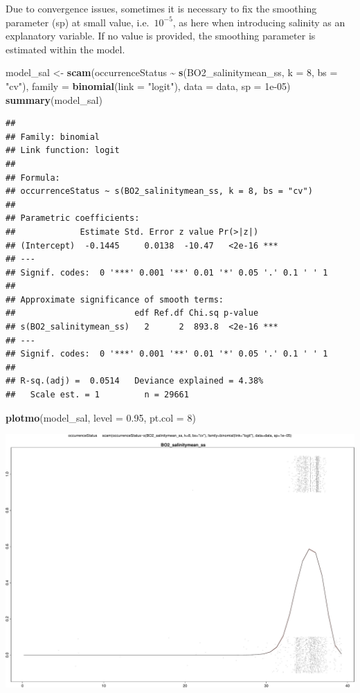 \documentclass[
]{book}
\newenvironment{Shaded}{\begin{snugshade}}{\end{snugshade}}
\newcommand{\AttributeTok}[1]{\textcolor[rgb]{0.13,0.29,0.53}{#1}}
\newcommand{\DecValTok}[1]{\textcolor[rgb]{0.00,0.00,0.81}{#1}}
\newcommand{\FloatTok}[1]{\textcolor[rgb]{0.00,0.00,0.81}{#1}}
\newcommand{\FunctionTok}[1]{\textcolor[rgb]{0.13,0.29,0.53}{\textbf{#1}}}
\newcommand{\NormalTok}[1]{#1}
\newcommand{\OtherTok}[1]{\textcolor[rgb]{0.56,0.35,0.01}{#1}}
\newcommand{\SpecialCharTok}[1]{\textcolor[rgb]{0.81,0.36,0.00}{\textbf{#1}}}
\newcommand{\StringTok}[1]{\textcolor[rgb]{0.31,0.60,0.02}{#1}}
\begin{document}
Due to convergence issues, sometimes it is necessary to fix the smoothing parameter (sp) at small value, i.e.~\(10^{-5}\), as here when introducing salinity as an explanatory variable. If no value is provided, the smoothing parameter is estimated within the model.

\begin{Shaded}
\begin{Highlighting}[]
\NormalTok{model\_sal }\OtherTok{\textless{}{-}} \FunctionTok{scam}\NormalTok{(occurrenceStatus }\SpecialCharTok{\textasciitilde{}} \FunctionTok{s}\NormalTok{(BO2\_salinitymean\_ss,}
    \AttributeTok{k =} \DecValTok{8}\NormalTok{, }\AttributeTok{bs =} \StringTok{"cv"}\NormalTok{), }\AttributeTok{family =} \FunctionTok{binomial}\NormalTok{(}\AttributeTok{link =} \StringTok{"logit"}\NormalTok{),}
    \AttributeTok{data =}\NormalTok{ data, }\AttributeTok{sp =} \FloatTok{1e{-}05}\NormalTok{)}
\FunctionTok{summary}\NormalTok{(model\_sal)}
\end{Highlighting}
\end{Shaded}

\begin{verbatim}
## 
## Family: binomial 
## Link function: logit 
## 
## Formula:
## occurrenceStatus ~ s(BO2_salinitymean_ss, k = 8, bs = "cv")
## 
## Parametric coefficients:
##             Estimate Std. Error z value Pr(>|z|)    
## (Intercept)  -0.1445     0.0138  -10.47   <2e-16 ***
## ---
## Signif. codes:  0 '***' 0.001 '**' 0.01 '*' 0.05 '.' 0.1 ' ' 1
## 
## Approximate significance of smooth terms:
##                        edf Ref.df Chi.sq p-value    
## s(BO2_salinitymean_ss)   2      2  893.8  <2e-16 ***
## ---
## Signif. codes:  0 '***' 0.001 '**' 0.01 '*' 0.05 '.' 0.1 ' ' 1
## 
## R-sq.(adj) =  0.0514   Deviance explained = 4.38%
##   Scale est. = 1         n = 29661
\end{verbatim}

\begin{Shaded}
\begin{Highlighting}[]
\FunctionTok{plotmo}\NormalTok{(model\_sal, }\AttributeTok{level =} \FloatTok{0.95}\NormalTok{, }\AttributeTok{pt.col =} \DecValTok{8}\NormalTok{)}
\end{Highlighting}
\end{Shaded}

\includegraphics{_main_files/figure-latex/unnamed-chunk-63-1.pdf}
\end{document}
